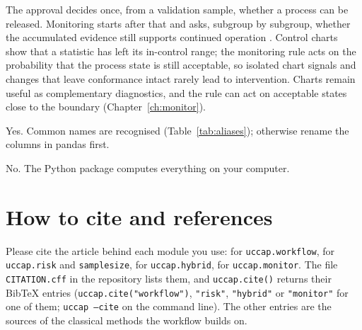 \documentclass[a4paper,11pt,oneside,openany,parskip=half-,headings=standardclasses,toc=flat,numbers=noenddot]{scrbook}
\newcommand{\code}[1]{\texttt{\begingroup\def\_{\textunderscore\allowbreak}#1\endgroup}}
\newcommand{\pkg}{\textsf{\bfseries uccap}}
\newcommand{\chapref}[1]{Chapter~\ref{#1}}
\newcommand{\tabref}[1]{Table~\ref{#1}}
\begin{document}
The approval decides once, from a validation sample, whether a process can be released. Monitoring starts after that
and asks, subgroup by subgroup, whether the accumulated evidence still supports continued operation
\cite[Sec.~1]{jy-monitor}. Control charts show that a statistic has left its in-control range; the monitoring rule acts
on the probability that the process state is still acceptable, so isolated chart signals and changes that leave
conformance intact rarely lead to intervention. Charts remain useful as complementary diagnostics, and the rule can
act on acceptable states close to the boundary (\chapref{ch:monitor}).

Yes. Common names are recognised (\tabref{tab:aliases}); otherwise rename the columns in pandas first.

\faq{Does \pkg{} send my data anywhere?}
No. The Python package computes everything on your computer.

\chapter{How to cite and references}\label{app:cite}

Please cite the article behind each module you use: \cite{jy-workflow} for \code{uccap.workflow}, \cite{jy-risk} for
\code{uccap.risk} and \code{sample\_size}, \cite{jy-hybrid} for \code{uccap.hybrid}, \cite{jy-monitor} for
\code{uccap.monitor}. The file \code{CITATION.cff} in the repository lists them, and \code{uccap.cite()} returns their
BibTeX entries (\code{uccap.cite("workflow")}, \code{"risk"}, \code{"hybrid"} or \code{"monitor"} for one of them;
\code{uccap --cite} on the command line). The other entries are the sources of the classical methods the workflow builds on.
\end{document}
